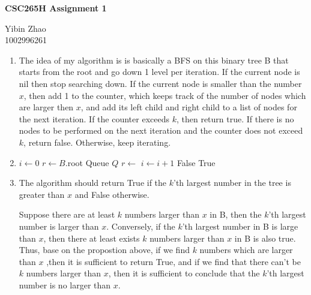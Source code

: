 \documentclass[10pt]{article}
\begin{document}
\begin{center}
{\bf \Large \bf CSC265H Assignment 1}\\
\end{center}

\noindent
Yibin Zhao\\
1002996261\\


\begin{enumerate}

\item
	The idea of my algorithm is is basically a BFS on this binary tree B that starts from the root and go down 1 level per iteration. If the current node is nil then stop searching down. If the current node is smaller than the number $x$, then add 1 to the counter, which keeps track of the number of nodes which are larger then $x$, and add its left child and right child to a list of nodes for the next iteration. If the counter exceeds $k$, then return true. If there is no nodes to be performed on the next iteration and the counter does not exceed $k$, return false. Otherwise, keep iterating.

\item 
\begin{algorithmic}[1]
		\State $i \gets 0$
		\State $r \gets B$.root
		\State Queue $Q$ 
		\State {} 
		 
			\State $r \gets$ 
				\State {}
				\State {}
				\State $i \gets i+1$
			\EndIf
		\EndWhile
			\State \Return False
		\Else
			\State \Return True
		\EndIf
	\EndFunction
\end{algorithmic}


\item %
	The algorithm should return True if the $k$'th largest number in the tree is greater than $x$ and False otherwise. 
   
 Suppose there are at least $k$ numbers larger than $x$ in B, then the $k$'th largest number is larger than $x$.
Conversely, if the $k$'th largest number in B is large than $x$, then there at least exists $k$ numbers larger than $x$ in B is also true. 
Thus, base on the propostion above, if we find $k$ numbers which are larger than $x$ ,then it is sufficient to return True, and if we find that there can't be $k$ numbers larger than $x$, then it is sufficient to conclude that the $k$'th largest number is no larger than $x$.


\end{enumerate}
\end{document}
